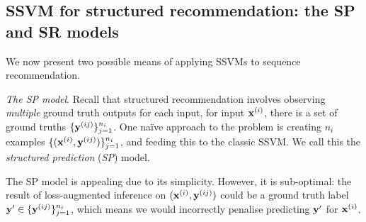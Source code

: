 \secmoveup
\subsection{SSVM for structured recommendation: the SP and SR models}
\label{ssec:sr}
\textmoveup

We now present two possible means of applying SSVMs to sequence recommendation.

\emph{The SP model}.
Recall that structured recommendation
involves observing \emph{multiple} ground truth outputs for each input, \ie
for input $\mathbf{x}^{({i})}$, there is a set of ground truths $\{\mathbf{y}^{({ij})}\}_{j=1}^{n_i}$.
One na\"{i}ve approach to the problem
is creating 
$n_i$ examples $\{(\mathbf{x}^{({i})}, \mathbf{y}^{({ij})})\}_{j=1}^{n_i}$,
and feeding this to the classic SSVM. %
We call this the \emph{structured prediction} (\emph{SP}) model.

The SP model is appealing due to its simplicity.
However, it is sub-optimal:
the result of loss-augmented inference on $(\mathbf{x}^{({i})}, \mathbf{y}^{({ij})})$ could be a ground truth label $\mathbf{y}' \in \{\mathbf{y}^{({ij})}\}_{j=1}^{n_i}$,
which means we would incorrectly penalise predicting $\mathbf{y}'$ for $\mathbf{x}^{({i})}$. 

